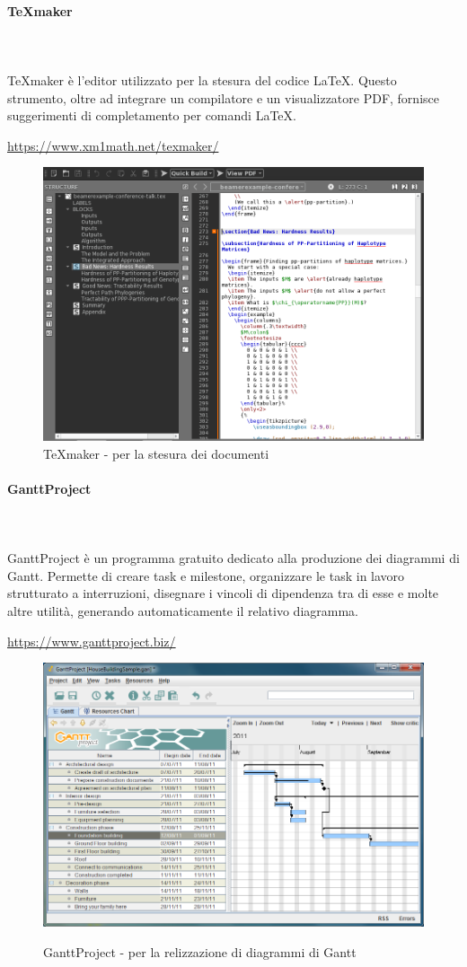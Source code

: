 \paragraph{\TeX{}maker}\mbox{} \\ \mbox{} \\
\TeX{}maker è l'editor utilizzato per la stesura del codice \LaTeX{}. Questo strumento, oltre ad integrare un compilatore e un visualizzatore PDF, fornisce suggerimenti di completamento per comandi \LaTeX{}. \\
\centerline{\url{https://www.xm1math.net/texmaker/}}
\begin{figure}[H]
\centering
	\includegraphics[width=0.70\linewidth]{../Norme_di_progetto/img/texMaker.png}
	\caption{\TeX{}maker - per la stesura dei documenti}
\end{figure}

\paragraph{GanttProject}\mbox{} \\ \mbox{} \\
GanttProject è un programma gratuito dedicato alla produzione dei diagrammi di Gantt\glo. Permette di creare task e milestone\glo, organizzare le task in lavoro strutturato a interruzioni, disegnare
i vincoli di dipendenza tra di esse e molte altre utilità, generando automaticamente il relativo diagramma. \\
\centerline{\url{https://www.ganttproject.biz/}}
\begin{figure}[H]
	\centering
	\includegraphics[width=0.70\linewidth]{../Norme_di_progetto/img/gantt.png}\\
			\caption{GanttProject - per la relizzazione di diagrammi di Gantt}
\end{figure}

